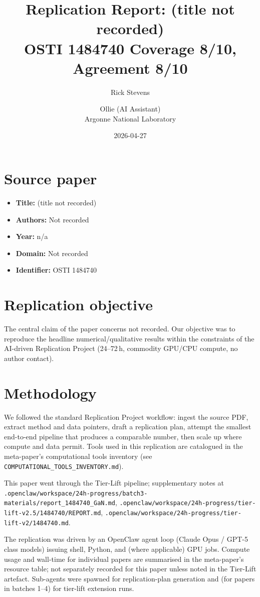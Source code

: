 \documentclass[11pt]{article}
\title{Replication Report: (title not recorded)\\[2pt]\large OSTI 1484740 \textbar{} Coverage 8/10, Agreement 8/10}
\author{Rick Stevens \and Ollie (AI Assistant)\\\small Argonne National Laboratory}
\date{2026-04-27}
\begin{document}
\maketitle

\section{Source paper}
\begin{itemize}
\item \textbf{Title:} (title not recorded)
\item \textbf{Authors:} Not recorded
\item \textbf{Year:} n/a
\item \textbf{Domain:} Not recorded
\item \textbf{Identifier:} OSTI 1484740
\end{itemize}


\section{Replication objective}
The central claim of the paper concerns not recorded. Our objective was to reproduce the headline numerical/qualitative results within the constraints of the AI-driven Replication Project (24--72\,h, commodity GPU/CPU compute, no author contact). 

\section{Methodology}
We followed the standard Replication Project workflow: ingest the source PDF, extract method and data pointers, draft a replication plan, attempt the smallest end-to-end pipeline that produces a comparable number, then scale up where compute and data permit. Tools used in this replication are catalogued in the meta-paper's computational tools inventory (see \texttt{COMPUTATIONAL\_TOOLS\_INVENTORY.md}).

This paper went through the Tier-Lift pipeline; supplementary notes at \texttt{.openclaw/workspace/24h-progress/batch3-materials/report\_1484740\_GaN.md}, \texttt{.openclaw/workspace/24h-progress/tier-lift-v2.5/1484740/REPORT.md}, \texttt{.openclaw/workspace/24h-progress/tier-lift-v2/1484740.md}.



The replication was driven by an OpenClaw agent loop (Claude Opus / GPT-5 class models) issuing shell, Python, and (where applicable) GPU jobs. Compute usage and wall-time for individual papers are summarised in the meta-paper's resource table; not separately recorded for this paper unless noted in the Tier-Lift artefact. Sub-agents were spawned for replication-plan generation and (for papers in batches 1--4) for tier-lift extension runs.
\end{document}
